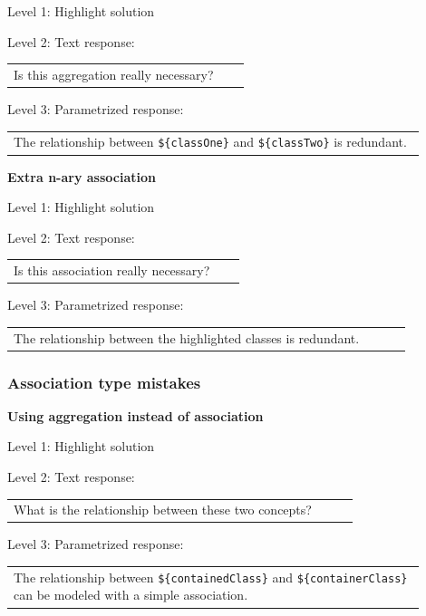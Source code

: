 \noindent Level 1: Highlight solution \medskip

\noindent Level 2: Text response: \medskip

\begin{tabular}{|p{0.9\linewidth}}
Is this aggregation really necessary?
\end{tabular} \medskip

\noindent Level 3: Parametrized response: \medskip

\begin{tabular}{|p{0.9\linewidth}}
The relationship between \verb|${classOne}| and \verb|${classTwo}| is redundant.
\end{tabular} \medskip


\noindent \textbf{Extra n-ary association} \medskip

\noindent Level 1: Highlight solution \medskip

\noindent Level 2: Text response: \medskip

\begin{tabular}{|p{0.9\linewidth}}
Is this association really necessary?
\end{tabular} \medskip

\noindent Level 3: Parametrized response: \medskip

\begin{tabular}{|p{0.9\linewidth}}
The relationship between the highlighted classes is redundant.
\end{tabular} \medskip


\subsubsection{Association type mistakes}

\noindent \textbf{Using aggregation instead of association} \medskip

\noindent Level 1: Highlight solution \medskip

\noindent Level 2: Text response: \medskip

\begin{tabular}{|p{0.9\linewidth}}
What is the relationship between these two concepts?
\end{tabular} \medskip

\noindent Level 3: Parametrized response: \medskip

\begin{tabular}{|p{0.9\linewidth}}
The relationship between \verb|${containedClass}| and \verb|${containerClass}| can be modeled with a simple association.
\end{tabular} \medskip

